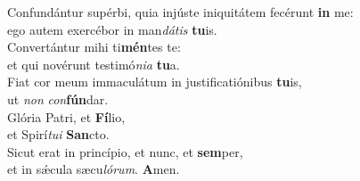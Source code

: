 \evenverse Confundántur supérbi, quia injúste iniquitátem fecérunt \textbf{in} me:~\*\\
\evenverse ego autem exercébor in man\textit{dá}\textit{tis} \textbf{tu}is.\\
\oddverse Convertántur mihi ti\textbf{mén}tes te:~\*\\
\oddverse et qui novérunt testimó\textit{ni}\textit{a} \textbf{tu}a.\\
\evenverse Fiat cor meum immaculátum in justificatiónibus \textbf{tu}is,~\*\\
\evenverse ut \textit{non} \textit{con}\textbf{fún}dar.\\
\oddverse Glória Patri, et \textbf{Fí}lio,~\*\\
\oddverse et Spirí\textit{tu}\textit{i} \textbf{San}cto.\\
\evenverse Sicut erat in princípio, et nunc, et \textbf{sem}per,~\*\\
\evenverse et in sǽcula sæcu\textit{ló}\textit{rum}. \textbf{A}men.\\
